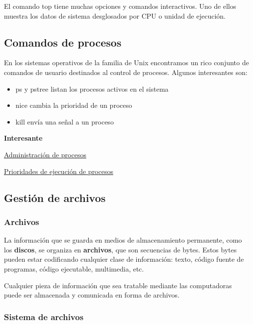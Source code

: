 \documentclass[spanish,a4paper,]{article}
\providecommand{\tightlist}{%
  \setlength{\itemsep}{0pt}\setlength{\parskip}{0pt}}
\begin{document}
El comando top tiene muchas opciones y comandos interactivos. Uno de
ellos muestra los datos de sistema desglosados por CPU o unidad de
ejecución.

\hypertarget{comandos-de-procesos}{%
\subsection{Comandos de procesos}\label{comandos-de-procesos}}

En los sistemas operativos de la familia de Unix encontramos un rico
conjunto de comandos de usuario destinados al control de procesos.
Algunos interesantes son:

\begin{itemize}
\tightlist
\item
  ps y pstree listan los procesos activos en el sistema
\item
  nice cambia la prioridad de un proceso
\item
  kill envía una señal a un proceso
\end{itemize}

\textbf{Interesante}

\href{https://www.ibm.com/developerworks/ssa/linux/library/l-lpic1-v3-103-5/}{Administración
de procesos}

\href{https://www.ibm.com/developerworks/ssa/linux/library/l-lpic1-v3-103-6}{Prioridades
de ejecución de procesos}

\hypertarget{gestiuxf3n-de-archivos}{%
\subsection{Gestión de archivos}\label{gestiuxf3n-de-archivos}}

\hypertarget{archivos}{%
\subsubsection{Archivos}\label{archivos}}

La información que se guarda en medios de almacenamiento permanente,
como los \textbf{discos}, se organiza en \textbf{archivos}, que son
secuencias de bytes. Estos bytes pueden estar codificando cualquier
clase de información: texto, código fuente de programas, código
ejecutable, multimedia, etc.

Cualquier pieza de información que sea tratable mediante las
computadoras puede ser almacenada y comunicada en forma de archivos.

\hypertarget{sistema-de-archivos}{%
\subsubsection{Sistema de archivos}\label{sistema-de-archivos}}
\end{document}
